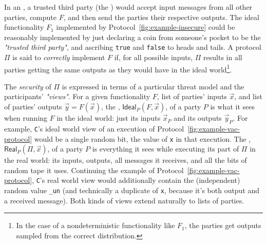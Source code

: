 \documentclass[acmlarge, manuscript, screen, review, anonymous, table]{acmart}
\newcommand{\inlinecode}[2][cho]{\lstinline[language=#1]{#2}}
\begin{document}
In an , a trusted third party (the ) would accept input messages
from all other parties, compute $F$, and then send the parties their respective outputs.
The ideal functionality $F_1$ implemented by Protocol~\ref{fig:example-insecure}
could be reasonably implemented by just declaring a coin from someone's pocket to be the \textit{"trusted third party"},
and ascribing \inlinecode{true} and \inlinecode{false} to heads and tails.
A  protocol $Π$ is said to \emph{correctly} implement $F$ if, for all possible inputs,
$Π$ results in all parties getting the same outputs as they would have in the ideal
world\footnote{In the case of a nondeterministic functionality like $F_1$, the parties get outputs sampled from the correct distribution.}.

The \emph{security} of $Π$ is expressed in terms of a particular threat model and the participants' \textit{"views"}.
For a given functionality $F$, list of parties' inputs $\vec{x}$, and list of parties' outputs $\vec{y}=F(\vec{x})$,
the , $\mathsf{Ideal}_P(F,\vec{x})$, of a party $P$ is what it sees when running $F$ in the ideal world:
just its inputs $\vec{x}_P$ and its outputs $\vec{y}_P$.
For example, \inlinecode{C}'s ideal world view of an execution of Protocol~\ref{fig:example-vac-protocol}
would be a single random bit, the value of \inlinecode{x} in that execution.
The , $\mathsf{Real}_P(Π, \vec{x})$, of a party $P$ is everything it sees while executing its part of $Π$ in the real world:
its inputs, outputs, all messages it receives, and all the bits of random tape it uses.
Continuing the example of Protocol~\ref{fig:example-vac-protocol}, \inlinecode{C}'s real world view would additionally contain
the (independent) random value \inlinecode{_un}
(and technically a duplicate of \inlinecode{x}, because it's both output and a received message).
Both kinds of views extend naturally to lists of parties.
\end{document}
